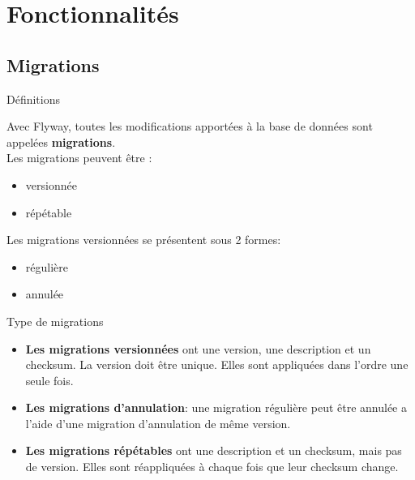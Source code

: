 \documentclass[slidestop,compress,11pt,xcolor=dvipsnames,french]{beamer}
\begin{document}
\section{Fonctionnalités}
\subsection*{Migrations}
\begin{frame}{Définitions}

Avec Flyway, toutes les modifications apportées à la base de données sont appelées \textbf{migrations}. \\
Les migrations peuvent être : 
\begin{itemize}
 \item versionnée
 \item répétable
\end{itemize}

Les migrations versionnées se présentent sous 2 formes:
\begin{itemize}
 \item régulière
 \item annulée
\end{itemize}

\end{frame}

\begin{frame}{Type de migrations}

\begin{itemize}
 \item \textbf{Les migrations versionnées} ont une version, une description et un checksum. La version doit être unique. Elles sont appliquées dans l'ordre une seule fois.
 \item \textbf{Les migrations d'annulation}: une migration régulière peut être annulée a l'aide d'une migration d'annulation de même version. 
 \item \textbf{Les migrations répétables} ont une description et un checksum, mais pas de version. Elles sont réappliquées à chaque fois que leur checksum change. 

\end{itemize}
\end{frame}
\end{document}
